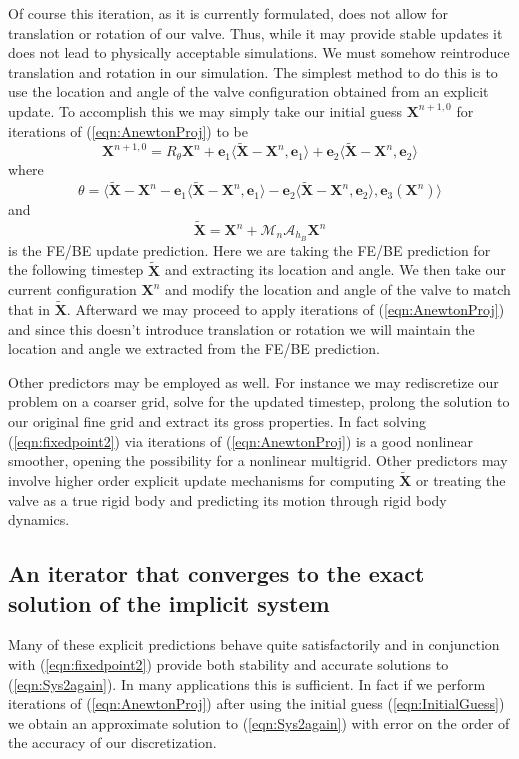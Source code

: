 \documentclass[preprint,12pt]{elsarticle}
\begin{document}
Of course this iteration, as it is currently formulated, does not allow for translation or rotation of our valve. Thus, while it may provide stable updates it does not lead to physically acceptable simulations. We must somehow reintroduce translation and rotation in our simulation.
The simplest method to do this is to use the location and angle of the valve configuration obtained from an explicit update. To accomplish this we may simply take our initial guess $\mathbf{X}^{n+1,0}$ for iterations of (\ref{eqn:AnewtonProj}) to be
\begin{equation}
\mathbf{X}^{n+1,0} = R_{\theta}\mathbf{X}^n + \mathbf{e}_1\langle\tilde{\mathbf{X}}-\mathbf{X}^n,\mathbf{e}_1\rangle
+ \mathbf{e}_2\langle\tilde{\mathbf{X}}-\mathbf{X}^n,\mathbf{e}_2\rangle
\label{eqn:InitialGuess}
\end{equation}
where
\begin{equation}
\theta = \langle\tilde{\mathbf{X}}-\mathbf{X}^n
-\mathbf{e}_1\langle\tilde{\mathbf{X}}-\mathbf{X}^n,\mathbf{e}_1\rangle
-\mathbf{e}_2\langle\tilde{\mathbf{X}}-\mathbf{X}^n,\mathbf{e}_2\rangle
,\mathbf{e}_3(\mathbf{X}^n)\rangle
\end{equation}
and
\begin{equation}
\tilde{\mathbf{X}} = \mathbf{X}^n + \mathcal{M}_n\mathcal{A}_{h_B}\mathbf{X}^n
\end{equation}
is the FE/BE update prediction. Here we are taking the FE/BE prediction for the following timestep $\tilde{\mathbf{X}}$ and extracting its location and angle. We then take our current configuration $\mathbf{X}^n$ and modify the location and angle of the valve to match that in $\tilde{\mathbf{X}}$. Afterward we may proceed to apply iterations of (\ref{eqn:AnewtonProj}) and since this doesn't introduce translation or rotation we will maintain the location and angle we extracted from the FE/BE prediction.

Other predictors may be employed as well. 
For instance we may rediscretize our problem on a coarser grid, solve for the updated timestep, prolong the solution to our original fine grid and extract its gross properties. In fact solving (\ref{eqn:fixedpoint2}) via iterations of (\ref{eqn:AnewtonProj}) is a good nonlinear smoother, opening the possibility for a nonlinear multigrid. Other predictors may involve higher order explicit update mechanisms for computing $\tilde{\mathbf{X}}$ or treating the valve as a true rigid body and predicting its motion through rigid body dynamics.

\subsection{An iterator that converges to the exact solution of the implicit system}
Many of these explicit predictions behave quite satisfactorily and in conjunction with (\ref{eqn:fixedpoint2}) provide both stability and accurate solutions to (\ref{eqn:Sys2again}). In many applications this is sufficient. In fact if we perform iterations of (\ref{eqn:AnewtonProj}) after using the initial guess (\ref{eqn:InitialGuess}) we obtain an approximate solution to (\ref{eqn:Sys2again}) with error on the order of the accuracy of our discretization.
\end{document}
